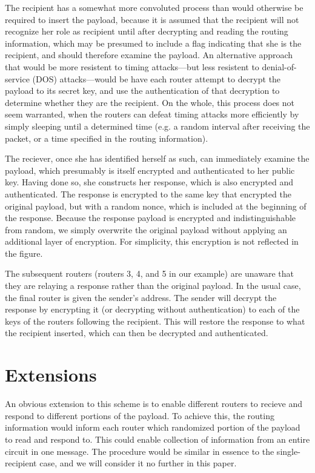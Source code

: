 \documentclass[letterpaper,twocolumn,amsmath,amssymb,pre,aps,10pt]{revtex4-1}
\begin{document}
The recipient has a somewhat more convoluted process than would
otherwise be required to insert the payload, because it is assumed
that the recipient will not recognize her role as recipient until
after decrypting and reading the routing information, which may be
presumed to include a flag indicating that she is the recipient, and
should therefore examine the payload.  An alternative approach that
would be more resistent to timing attacks---but less resistent to
denial-of-service (DOS) attacks---would be have each router attempt to
decrypt the payload to its secret key, and use the authentication of
that decryption to determine whether they are the recipient.  On the
whole, this process does not seem warranted, when the routers can
defeat timing attacks more efficiently by simply sleeping until a
determined time (e.g. a random interval after receiving the packet, or
a time specified in the routing information).

The reciever, once she has identified herself as such, can immediately
examine the payload, which presumably is itself encrypted and
authenticated to her public key.  Having done so, she constructs her
response, which is also encrypted and authenticated.  The response is
encrypted to the same key that encrypted the original payload, but
with a random nonce, which is included at the beginning of the
response.  Because the response payload is encrypted and
indistinguishable from random, we simply overwrite the original
payload without applying an additional layer of encryption.  For
simplicity, this encryption is not reflected in the figure.

The subsequent routers (routers 3, 4, and 5 in our example) are
unaware that they are relaying a response rather than the original
payload.  In the usual case, the final router is given the sender's
address.  The sender will decrypt the response by encrypting it (or
decrypting without authentication) to each of the keys of the routers
following the recipient.  This will restore the response to what the
recipient inserted, which can then be decrypted and authenticated.

\section{Extensions}

An obvious extension to this scheme is to enable different routers to
recieve and respond to different portions of the payload.  To achieve
this, the routing information would inform each router which
randomized portion of the payload to read and respond to. This could
enable collection of information from an entire circuit in one
message.  The procedure would be similar in essence to the
single-recipient case, and we will consider it no further in this
paper.
\end{document}
